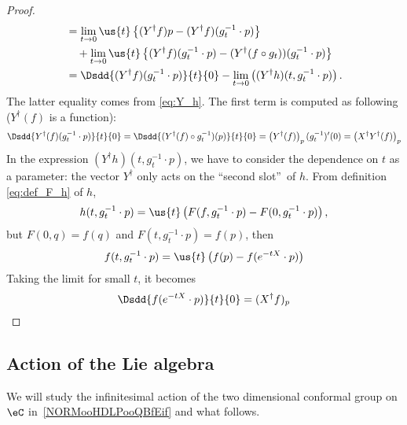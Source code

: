 \begin{proof}
\begin{equation}
\begin{aligned}
                     &=\lim_{t\to 0}\us{t}\left\{ (Y^{\dag} f)p-(Y^{\dag} f)(g_t^{-1}\cdot p) \right\}\\
		     &\quad+\lim_{t\to 0}\us{t}\left\{ (Y^{\dag} f)(g_t^{-1}\cdot p)
		                                      -(Y^{\dag}(f\circ g_t) )(g_t^{-1}\cdot p)
					       \right\}\\
   &=\Dsdd{ (Y^{\dag} f)(g_t^{-1}\cdot p) }{t}{0}-\lim_{t\to 0}
                \left(    (Y^{\dag} h)(t,g_t^{-1}\cdot p)       \right).
\end{aligned}
\end{equation}
The latter equality comes from  \eqref{eq:Y_h}. The first term is computed as following ($Y^{\dag}(f)$ is a function):
\begin{equation}
\Dsdd{ Y^{\dag}(f)(g_t^{-1}\cdot p) }{t}{0}=\Dsdd{ (Y^{\dag}(f)\circ g_t^{-1})(p) }{t}{0}
                                        =\left( Y^{\dag}(f) \right)_p(g_t^{-1})'(0)
					=\left( X^{\dag} Y^{\dag}(f)\right)_p
\end{equation}
In the expression $(Y^{\dag} h)(t,g_t^{-1}\cdot p)$, we have to consider the dependence on $t$ as a parameter: the vector $Y^{\dag}$ only acts on the ``second slot''\ of $h$. From definition \eqref{eq:def_F_h} of $h$,
\[
   h(t,g_t^{-1}\cdot p)=\us{t}\left(  F(f,g_t^{-1}\cdot p)-F(0,g_t^{-1}\cdot p)
                             \right),
\]
but $F(0,q)=f(q)$ and $F(t,g_t^{-1}\cdot p)=f(p)$, then
\[
  f(t,g_t^{-1}\cdot p)=\us{t}\left( f(p)-f(e^{-tX}\cdot p) \right)
\]
Taking the limit for small $t$, it becomes
\[
  \Dsdd{f(e^{-tX}\cdot p)}{t}{0}=(X^{\dag} f)_p
\]

\end{proof}

\subsection{Action of the Lie algebra}

\begin{normaltext}
    We will study the infinitesimal action of the two dimensional conformal group on $\eC$ in~\ref{NORMooHDLPooQBfEif} and what follows.
\end{normaltext}

